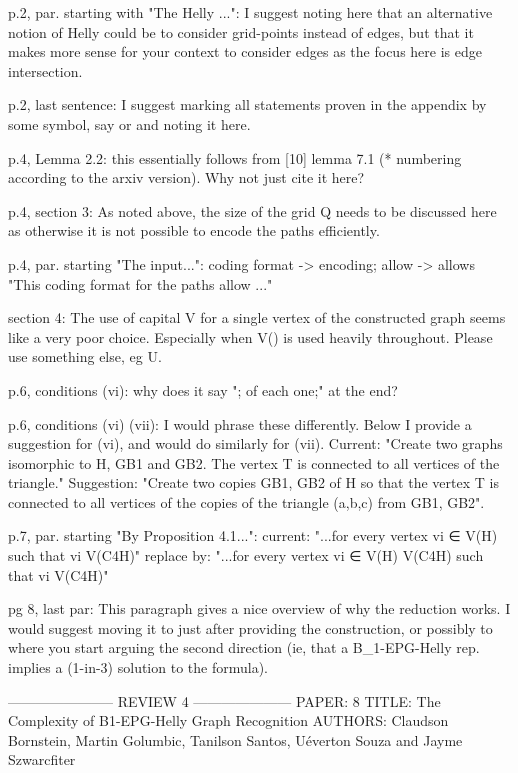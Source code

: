 p.2, par. starting with "The Helly ...": I suggest noting here that an alternative notion of Helly could be to consider grid-points instead of edges, but that it makes more sense for your context to consider edges as the focus here is edge intersection. 

p.2, last sentence: I suggest marking all statements proven in the appendix by some symbol, say \star or \daggar and noting it here. 

p.4, Lemma 2.2: this essentially follows from [10] lemma 7.1 (* numbering according to the arxiv version). Why not just cite it here? 

p.4, section 3: As noted above, the size of the grid Q needs to be discussed here as otherwise it is not possible to encode the paths efficiently. 

p.4, par. starting "The input...": coding format -> encoding; allow -> allows
"This coding format for the paths allow ..."

section 4: The use of capital V for a single vertex of the constructed graph seems like a very poor choice. Especially when V() is used heavily throughout. Please use something else, eg U. 

p.6, conditions (vi): why does it say "; of each one;" at the end? 

p.6, conditions (vi) (vii): I would phrase these differently. Below I provide a suggestion for (vi), and would do similarly for (vii). 
Current: "Create two graphs isomorphic to H, GB1 and GB2. The vertex T is connected to all vertices of the triangle."
Suggestion: "Create two copies GB1, GB2 of H so that the vertex T is connected to all vertices of the copies of the triangle (a,b,c) from GB1, GB2". 

p.7, par. starting "By Proposition 4.1...": 
current: "...for every vertex vi ∈ V(H) such that vi \neq V(C4H)"
replace by: "...for every vertex vi ∈ V(H) \setminus V(C4H) such that vi \neq V(C4H)"

pg 8, last par: This paragraph gives a nice overview of why the reduction works. I would suggest moving it to just after providing the construction, or possibly to where you start arguing the second direction (ie, that a B_1-EPG-Helly rep. implies a (1-in-3) solution to the formula).


----------------------- REVIEW 4 ---------------------
PAPER: 8
TITLE: The Complexity of B1-EPG-Helly Graph Recognition
AUTHORS: Claudson Bornstein, Martin Golumbic, Tanilson Santos, Uéverton Souza and Jayme Szwarcfiter


